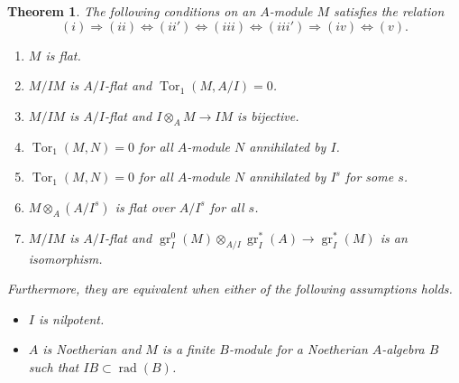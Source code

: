 \documentclass[leqno]{amsart}
\makeatletter
\newcommand\myprimeitem{%
 \item[(\roman{enumi}\textquotesingle)]\def\@currentlabel{(\roman{enumi}\textquotesingle)}}
\DeclareMathOperator{\gr}{gr}
\DeclareMathOperator{\rad}{rad}
\newcommand{\1}{\mathbf{1}}
\DeclareMathOperator{\Tor}{Tor}
\newtheorem{thm}{Theorem}[section]
\theoremstyle{definition}
\theoremstyle{remark}
\makeatother
\begin{document}
\begin{thm}
	The following conditions on an $A$-module $M$
	satisfies the relation
	\[
		(i)\Longrightarrow 
		(ii) \Longleftrightarrow (ii')\Longleftrightarrow 
		(iii) \Longleftrightarrow (iii') \Longrightarrow
		(iv) \Longleftrightarrow (v).
	\]
	\begin{enumerate}[label=(\roman*)]
		\item $M$ is flat.
		\item  $M/IM$ is $A/I$-flat and $\Tor_1(M,A/I)=0$.
		\myprimeitem  $M/IM$ is $A/I$-flat 
		and $I\otimes_AM\to IM$ is bijective.
		\item $\Tor_1(M,N)=0$ for all $A$-module $N$ annihilated by $I$.
		\myprimeitem $\Tor_1(M,N)=0$ 
		for all $A$-module $N$ annihilated by $I^s$ for some $s$.
		\item $M\otimes_A(A/I^s)$ is flat over $A/I^s$ for all $s$.
		\item  $M/IM$ is $A/I$-flat and 
			$\gr_I^0(M)\otimes_{A/I}\gr_I^*(A)\to \gr_I^*(M)$
			is an isomorphism.
	\end{enumerate}
	Furthermore, they are equivalent
	when either of the following assumptions holds.
	\begin{itemize}
		\item $I$ is nilpotent.
		\item $A$ is Noetherian and $M$ is a finite  $B$-module
		for a Noetherian $A$-algebra $B$ such that $IB\subset\rad(B)$.
	\end{itemize}
\end{thm}
\end{document}
